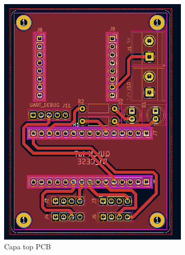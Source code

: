 \begin{figure}[h!]
  \centering
  \begin{subfigure}[b]{0.28\linewidth}
  \includegraphics[width=\linewidth]{./Figures/pcb_top.png}
  \caption{Capa top PCB}
  \label{fig:Capa top PCB}
  \end{subfigure}
  \begin{subfigure}[b]{0.27\linewidth}

\end{subfigure}
\end{figure}

